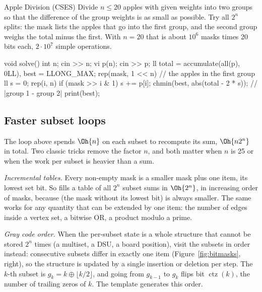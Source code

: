 \begin{problem}{Apple Division (CSES)}
Divide $n \le 20$ apples with given weights into two groups so that the difference of the group weights is as small as
possible.
\solution Try all $2^n$ splits: the mask lists the apples that go into the first group, and the second group weighs the total
minus the first. With $n = 20$ that is about $10^6$ masks times 20 bits each, $2\cdot10^7$ simple operations.
\end{problem}

\begin{code}
void solve() {
    int n;
    cin >> n;
    vi p(n);
    cin >> p;
    ll total = accumulate(all(p), 0LL), best = LLONG_MAX;
    rep(mask, 1 << n) {  // the apples in the first group
        ll s = 0;
        rep(i, n) if (mask >> i & 1) s += p[i];
        chmin(best, abs(total - 2 * s));  // |group 1 - group 2|
    }
    print(best);
}
\end{code}


\subsection{Faster subset loops}

The loop above spends $\Oh{n}$ on each subset to recompute its sum, $\Oh{n 2^n}$ in total. Two classic tricks remove the
factor $n$, and both matter when $n$ is 25 or when the work per subset is heavier than a sum.

\emph{Incremental tables.} Every non-empty mask is a smaller mask plus one item, its lowest set bit. So
 fills a table of all $2^n$ subset sums in $\Oh{2^n}$, in
increasing order of masks, because  (the mask without its lowest bit) is always smaller. The same works
for any quantity that can be extended by one item: the number of edges inside a vertex set, a bitwise OR, a product modulo a
prime.

\emph{Gray code order.} When the per-subset state is a whole structure that cannot be stored $2^n$ times (a multiset, a DSU,
a board position), visit the subsets in  order instead: consecutive subsets differ in exactly one item
(Figure~\ref{fig:bitmasks}, right), so the structure is updated by a single insertion or deletion per step. The $k$-th subset
is $g_k = k \oplus \lfloor k/2\rfloor$, and going from $g_{k-1}$ to $g_k$ flips bit $\operatorname{ctz}(k)$, the number of
trailing zeros of $k$. The template generates this order.

